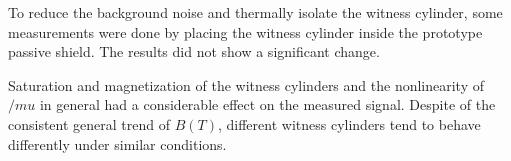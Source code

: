 To reduce the background noise and
thermally isolate the witness cylinder, some measurements were done by
placing the witness cylinder inside the prototype passive shield. The
results did not show a significant change.


Saturation and magnetization of the witness cylinders and the nonlinearity of $/mu$ in general had
a considerable effect on the measured signal. Despite of the
consistent general trend of $B(T)$, different witness cylinders tend
to behave differently under similar conditions. 












